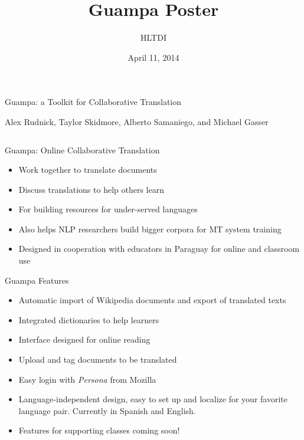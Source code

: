 \documentclass[final]{beamer}
\title{Guampa Poster}
\author{HLTDI}
\institute[Indiana University]{School of Informatics and Computing, Indiana University}
\date{April 11, 2014}
\begin{document}
\begin{frame}{} 
  \begin{block}
    {\centering \Huge Guampa: a Toolkit for Collaborative Translation}\par
    \centering
    {\large Alex Rudnick, Taylor Skidmore, Alberto Samaniego, and Michael Gasser}
    \par
  \end{block}

\begin{columns}[t]

  \begin{column}{.32\linewidth}

  \vfill
  \begin{block}{\large Guampa: Online Collaborative Translation}
    \centering
    \begin{itemize}
    \item Work together to translate documents
    \item Discuss translations to help others learn
    \item For building resources for under-served languages
    \item Also helps NLP researchers build bigger corpora for MT system training
    \item Designed in cooperation with educators in Paraguay for online and
    classroom use
    \end{itemize}
  \end{block}

  \begin{block}{\large Guampa Features}
    \centering
    \begin{itemize}
    \item Automatic import of Wikipedia documents and export of translated texts
    \item Integrated dictionaries to help learners
    \item Interface designed for online reading
    \item Upload and tag documents to be translated
    \item Easy login with \emph{Persona} from Mozilla
    \item Language-independent design, easy to set up and localize for your
    favorite language pair. Currently in Spanish and English.
    \item Features for supporting classes coming soon!
    \end{itemize}
  \end{block}
  \centering


\end{column}
\end{columns}
\end{frame}
\end{document}
